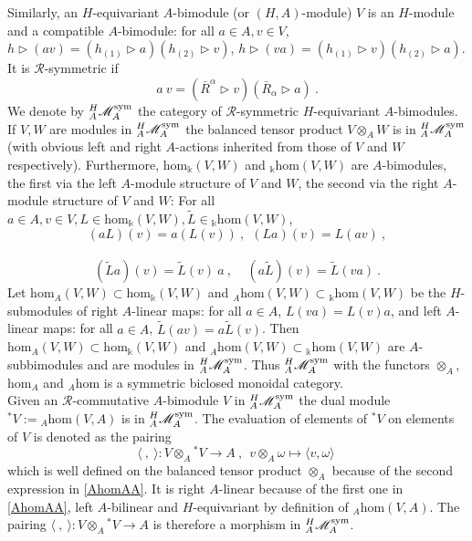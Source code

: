 \documentclass[12pt]{article}
\numberwithin{equation}{section}
\theoremstyle{plain}
\theoremstyle{definition}
\theoremstyle{remark}
\def\oA{\otimes_A}
\def\MMM{\mathscr{M}}
\def\ra{\triangleright}
\def\le{\langle}
\def\re{\rangle}
\def\le{\langle}
\def\re{\rangle}
\def\AA{A}
\def\sym{{\rm{sym}}}
\def\oR{\bar R}
\def\al{\alpha}
\def\cat{{{}^H_\AA\MMM_\AA^\sym}}
\def\hom{\mathrm{hom}}
\def\hxi{h}
\begin{document}
Similarly, an $H$-equivariant $A$-bimodule (or
$(H,A)$-module) $V$ is an $H$-module and a compatible $A$-bimodule:
for all $a\in A,v\in V$,
$\hxi\rhd(a v)=(\hxi_{(1)}\rhd a)(\hxi_{(2)}\rhd v) $, 
$\hxi\rhd(v a)=(\hxi_{(1)}\rhd v)(\hxi_{(2)}\rhd a) $.
It is ${\mathcal{R}}$-symmetric if
\begin{equation}\label{bsmodV}
  a\:\!v =
  (\oR^{\al}\ra v )  (\oR_{\al}\ra a)~.
  \end{equation}
%
We denote by $\cat$ the category of ${\mathcal{R}}$-symmetric
$H$-equivariant $A$-bimodules.
If $V,W$ are modules in $\cat$  the balanced tensor product $V\oA
W$ is in $\cat$
(with obvious left and right
 $A$-actions inherited from those of $V$ and $W$ respectively).
 Furthermore, $\hom_\Bbbk(V,W)$ and ${}_\Bbbk\hom(V,W)$ are $A$-bimodules, the
 first via the left $A$-module structure of $V$
 and $W$, the second via the right $A$-module
 structure of 
 $V$ and $W$: For all $a\in A, v\in V, L\in
 \hom_\Bbbk(V,W), \tilde L\in {}_\Bbbk\hom(V,W)$,
 \begin{equation}
 \label{aLvLav}
 (aL)(v)=a(L(v))~,~~(La)(v)=L(av)~,
 \end{equation}
 \\[-2.6em]\begin{equation}\label{AhomAA}
 (\tilde L a)(v)=\tilde
 L(v)\:\!a~,\,\,\,\,~~(a\tilde L)(v)=\tilde L(va)~.
 \end{equation} 
Let  $\hom_A(V,W)\subset \hom_\Bbbk(V,W)$ and
${}_A\hom(V,W)\subset {}_\Bbbk\hom(V,W)$ be  the $H$-submodules of
right $A$-linear maps: for all $a\in A$, $L(va)=L(v)a$,
and left $A$-linear maps: for all $a\in A$, $\tilde L(av)=a\tilde
L(v)$.
 Then $\hom_A(V,W)\subset \hom_\Bbbk(V,W)$ and
${}_A\hom(V,W)\subset {}_\Bbbk\hom(V,W)$ are $A$-subbimodules
and are modules in $\cat$.  Thus $\cat$
 with the functors $\otimes_A$, $\hom_A$ and ${}_A\hom$
is a symmetric biclosed monoidal category.
\\

Given an  ${\mathcal{R}}$-commutative $A$-bimodule $V$ in $\cat$ the dual module ${}^*V:=
{}_A\hom(V,A)$ is in $\cat$. The evaluation of  elements of  ${}^*V$ on 
elements of $V$ is denoted as the pairing
\begin{equation}
  \label{evaluation<>}
    \langle~,~\rangle : V \otimes_\AA {}^*V\to
    \AA~,~~v\otimes_A {}\omega\mapsto \le v, {}\omega\re~
  \end{equation}
which is well defined on the balanced tensor product $\otimes_A$ because of
the second expression in \eqref{AhomAA}. It is right $A$-linear because of
the first one in \eqref{AhomAA},  left $A$-bilinear and
$H$-equivariant by definition of
${}_\AA\hom(V,A)$. The pairing  $ \langle~,~\rangle : V \otimes_\AA {}^*V\to
    A$ is therefore a morphism in $\cat$.
\end{document}
